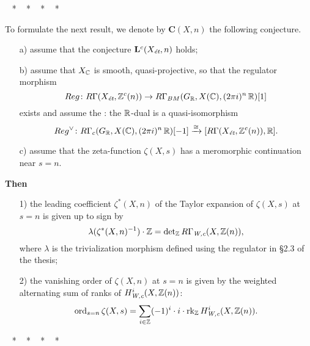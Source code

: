\documentclass{article}
\begin{document}
\begin{center}
  \noindent * ~ * ~ * ~ * ~ *
\end{center}

To formulate the next result, we denote by $\mathbf{C} (X,n)$ the following
conjecture.

{\it
  \begin{enumerate}
  \item[a)] assume that the conjecture $\mathbf{L}^c (X_\text{\it ét}, n)$ holds;

  \item[b)] assume that $X_{\mathbb{C}}$ is smooth, quasi-projective, so that the regulator
    morphism
    \[ Reg\colon R\Gamma (X_\text{\it ét}, \mathbb{Z}^c (n)) \to
      R\Gamma_{BM} (G_{\mathbb{R}}, X (\mathbb{C}), (2\pi i)^n\,\mathbb{R}) [1] \]
    exists and assume the : the $\mathbb{R}$-dual is a
    quasi-isomorphism
    \[ Reg^\vee\colon R\Gamma_c (G_{\mathbb{R}}, X (\mathbb{C}), (2\pi i)^n\,\mathbb{R}) [-1] \xrightarrow{\cong}
      [R\Gamma (X_\text{\it ét}, \mathbb{Z}^c (n)), \mathbb{R}]. \]

  \item[c)] assume that the zeta-function $\zeta (X,s)$ has a meromorphic
    continuation near $s=n$.
  \end{enumerate}

  \textbf{Then}

  \begin{enumerate}
  \item[1)] the leading coefficient $\zeta^* (X,n)$ of the Taylor expansion of
    $\zeta (X,s)$ at $s = n$ is given up to sign by
    \[ \lambda (\zeta^* (X,n)^{-1})\cdot \mathbb{Z} =
      \det\nolimits_{\mathbb{Z}} R\Gamma_\text{\it W,c} (X, \mathbb{Z} (n)), \]
    where $\lambda$ is the trivialization morphism defined using the regulator in
    \S 2.3 of the thesis;

  \item[2)] the vanishing order of $\zeta (X,n)$ at $s = n$ is given by the
    weighted alternating sum of ranks of $H^i_\text{\it W,c} (X, \mathbb{Z} (n))$:
    \[ \operatorname{ord}_{s=n} \zeta (X,s) =
      \sum_{i\in\mathbb{Z}} (-1)^i \cdot i \cdot \operatorname{rk}_{\mathbb{Z}} H^i_\text{\it W,c} (X, \mathbb{Z} (n)). \]
  \end{enumerate}}

\begin{center}
  \noindent * ~ * ~ * ~ * ~ *
\end{center}
\end{document}
